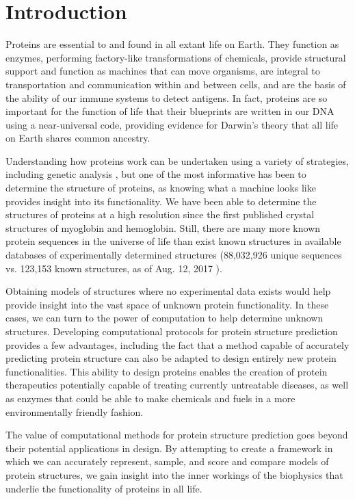 \chapter{Introduction}

Proteins are essential to and found in all extant life on Earth.
They function as enzymes, performing factory-like transformations of chemicals,
provide structural support and function as machines that can move organisms,
are integral to transportation and communication within and between cells,
and are the basis of the ability of our immune systems to detect antigens.
In fact, proteins are so important for the function of life that their blueprints are written in our DNA\cite{avery_studies_1944} using a near-universal code\cite{crick_origin_1968,hinegardner_rationale_1963},
providing evidence for Darwin's theory that all life on Earth shares common ancestry\cite{darwin_origin_1859}.

Understanding how proteins work can be undertaken using a variety of strategies, including genetic analysis \cite{lander_initial_2001}, but one of the most informative has been to determine the structure of proteins, as knowing what a machine looks like provides insight into its functionality.
We have been able to determine the structures of proteins at a high resolution since the first published crystal structures of myoglobin and hemoglobin\cite{kendrew_three-dimensional_1958,perutz_structure_1960}.
Still, there are many more known protein sequences in the universe of life than exist known structures in available databases of experimentally determined structures (88,032,926 unique sequences vs. 123,153 known structures, as of Aug. 12, 2017 \cite{berman_protein_2000,noauthor_uniprot:_2017}).

Obtaining models of structures where no experimental data exists would help provide insight into the vast space of unknown protein functionality.
In these cases, we can turn to the power of computation to help determine unknown structures.
Developing computational protocols for protein structure prediction provides a few advantages, including the fact that a method capable of accurately predicting protein structure can also be adapted to design entirely new protein functionalities.
This ability to design proteins enables the creation of protein therapeutics potentially capable of treating currently untreatable diseases, as well as enzymes that could be able to make chemicals and fuels in a more environmentally friendly fashion.

The value of computational methods for protein structure prediction goes beyond their potential applications in design.
By attempting to create a framework in which we can accurately represent, sample, and score and compare models of protein structures, we gain insight into the inner workings of the biophysics that underlie the functionality of proteins in all life.

